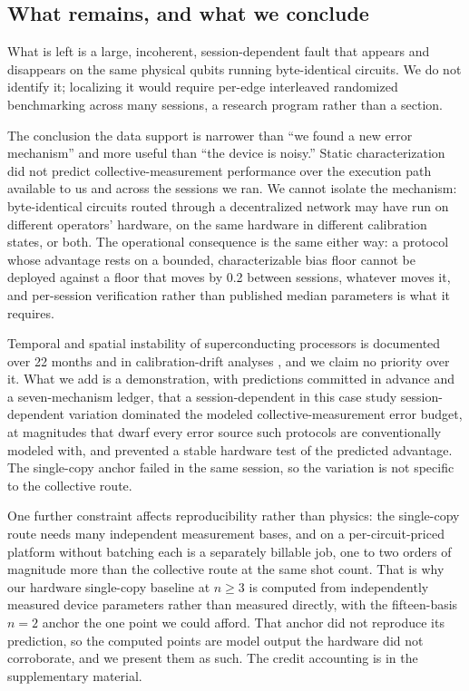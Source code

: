 \hypertarget{what-remains-and-what-we-conclude}{%
\subsection{What remains, and what we
conclude}\label{what-remains-and-what-we-conclude}}

What is left is a large, incoherent, session-dependent fault that appears
and disappears on the same physical qubits running byte-identical
circuits. We do not identify it; localizing it would require per-edge
interleaved randomized benchmarking across many sessions, a research
program rather than a section.

The conclusion the data support is narrower than ``we found a new error
mechanism'' and more useful than ``the device is noisy.'' Static
characterization did not predict collective-measurement performance over
the execution path available to us and across the sessions we ran. We
cannot isolate the mechanism: byte-identical circuits routed through a
decentralized network may have run on different operators' hardware, on
the same hardware in different calibration states, or both. The operational
consequence is the same either way: a protocol whose advantage rests on
a bounded, characterizable bias floor cannot be deployed against a floor
that moves by 0.2 between sessions, whatever moves it, and per-session
verification rather than published median parameters is what it requires.

Temporal and spatial instability of superconducting processors is
documented over 22 months \cite{dasgupta2021stability,dasgupta2022assessing}
and in calibration-drift analyses \cite{fewshot2026}, and we claim no
priority over it. What we add is a demonstration, with predictions
committed in advance and a seven-mechanism ledger, that a session-dependent
in this case study session-dependent variation dominated the modeled
collective-measurement error budget, at magnitudes that dwarf every
error source such protocols are conventionally modeled with, and
prevented a stable hardware test of the predicted advantage. The
single-copy anchor failed in the same session, so the variation is not
specific to the collective route.

One further constraint affects reproducibility rather than physics: the
single-copy route needs many independent measurement bases, and on a
per-circuit-priced platform without batching each is a separately billable
job, one to two orders of magnitude more than the collective route at
the same shot count. That is why our hardware single-copy baseline at
\(n \geq 3\) is computed from independently measured device parameters
rather than measured directly, with the fifteen-basis \(n = 2\) anchor the
one point we could afford. That anchor did not reproduce its prediction,
so the computed points are model output the hardware did not corroborate,
and we present them as such. The credit accounting is in the supplementary
material.

